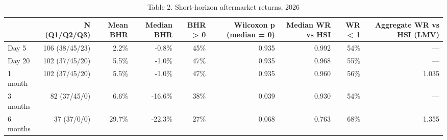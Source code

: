 \begin{table}[htbp]\centering\small
\caption{Table 2. Short-horizon aftermarket returns, 2026}
\begin{tabular}{lrrrrrrrr}
\hline
 & N (Q1/Q2/Q3) & Mean BHR & Median BHR & BHR > 0 & Wilcoxon p (median = 0) & Median WR vs HSI & WR < 1 & Aggregate WR vs HSI (LMV) \\
\hline
Day 5 & 106 (38/45/23) & 2.2\% & -0.8\% & 45\% & 0.935 & 0.992 & 54\% & — \\
Day 20 & 102 (37/45/20) & 5.5\% & -1.0\% & 47\% & 0.935 & 0.968 & 55\% & — \\
1 month & 102 (37/45/20) & 5.5\% & -1.0\% & 47\% & 0.935 & 0.960 & 56\% & 1.035 \\
3 months & 82 (37/45/0) & 6.6\% & -16.6\% & 38\% & 0.039 & 0.930 & 54\% & — \\
6 months & 37 (37/0/0) & 29.7\% & -22.3\% & 27\% & 0.068 & 0.763 & 68\% & 1.355 \\
\hline
\end{tabular}
\end{table}
